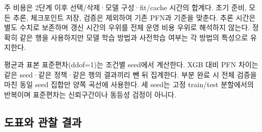 주 비용은 2단계 이후 선택/\allowbreak{}삭제·모델 구성·fit/\allowbreak{}cache 시간의 합계다. 초기 준비, 모든 추론, 체크포인트 저장, 검증은 제외하여 기존 PFN과 기준을 맞춘다. 추론 시간은 별도 수치로 보존하며 갱신 시간의 우위를 전체 운영 비용 우위로 해석하지 않는다. 정확히 같은 행을 사용하지만 모델 학습 방법과 사전학습 여부는 각 방법의 특성으로 유지한다.

평균과 표본 표준편차(ddof=\allowbreak{}1)는 조건별 seed에서 계산한다. XGB 대비 PFN 차이는 같은 seed·같은 정책·같은 행의 결과끼리 뺀 뒤 집계한다. 부분 완료 시 전체 검증을 마친 동일 seed 집합만 양쪽 곡선에 사용한다. 세 seed는 고정 train/\allowbreak{}test 분할에서의 반복이며 표준편차는 신뢰구간이나 동등성 검정이 아니다.

\subsection{도표와 관찰 결과}








